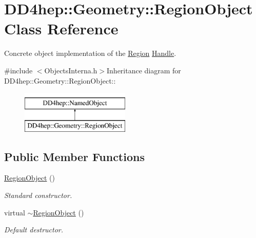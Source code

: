 \hypertarget{class_d_d4hep_1_1_geometry_1_1_region_object}{
\section{DD4hep::Geometry::RegionObject Class Reference}
\label{class_d_d4hep_1_1_geometry_1_1_region_object}
}


Concrete object implementation of the \hyperlink{class_d_d4hep_1_1_geometry_1_1_region}{Region} \hyperlink{class_d_d4hep_1_1_handle}{Handle}.  


{\ttfamily \#include $<$ObjectsInterna.h$>$}Inheritance diagram for DD4hep::Geometry::RegionObject::\begin{figure}[H]
\begin{center}
\leavevmode
\includegraphics[height=2cm]{class_d_d4hep_1_1_geometry_1_1_region_object}
\end{center}
\end{figure}
\subsection*{Public Member Functions}
\begin{DoxyCompactItemize}
\item 
\hyperlink{class_d_d4hep_1_1_geometry_1_1_region_object_a2ef1c820eaadf3add13852335e791a62}{RegionObject} ()
\begin{DoxyCompactList}\small\item\em Standard constructor. \item\end{DoxyCompactList}\item 
virtual \hyperlink{class_d_d4hep_1_1_geometry_1_1_region_object_a254eb8e472a5d43755b32b0f09be6023}{$\sim$RegionObject} ()
\begin{DoxyCompactList}\small\item\em Default destructor. \item\end{DoxyCompactList}\end{DoxyCompactItemize}
